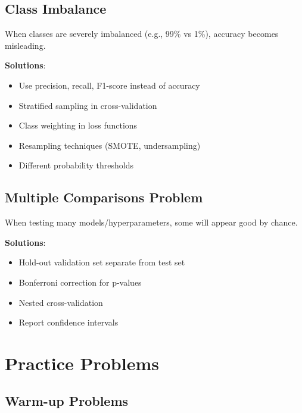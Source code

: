 \documentclass{article}
\begin{document}
\subsection{Class Imbalance}

When classes are severely imbalanced (e.g., 99\% vs 1\%), accuracy becomes misleading.

\textbf{Solutions}:
\begin{itemize}
    \item Use precision, recall, F1-score instead of accuracy
    \item Stratified sampling in cross-validation
    \item Class weighting in loss functions
    \item Resampling techniques (SMOTE, undersampling)
    \item Different probability thresholds
\end{itemize}

\subsection{Multiple Comparisons Problem}

When testing many models/hyperparameters, some will appear good by chance.

\textbf{Solutions}:
\begin{itemize}
    \item Hold-out validation set separate from test set
    \item Bonferroni correction for p-values
    \item Nested cross-validation
    \item Report confidence intervals
\end{itemize}

\section{Practice Problems}

\subsection{Warm-up Problems}
\end{document}

